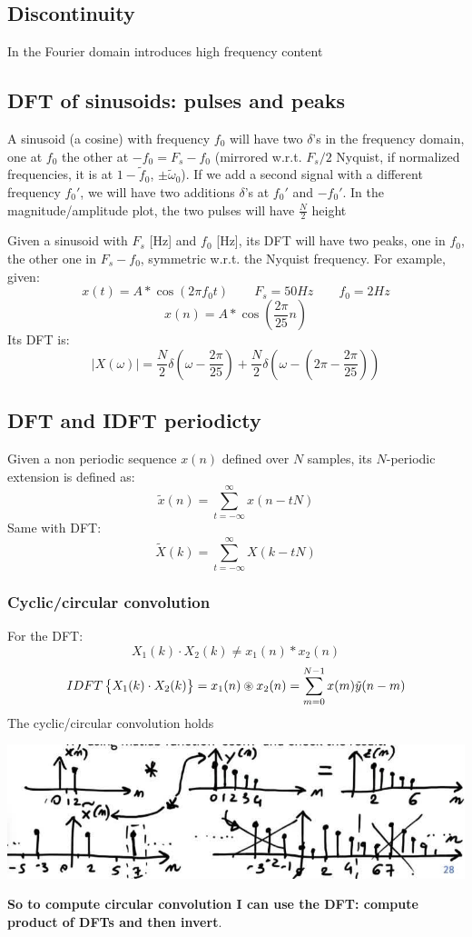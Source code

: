 \subsection{Discontinuity}
In the Fourier domain introduces high frequency content

\subsection{DFT of sinusoids: pulses and peaks}
A sinusoid (a cosine) with frequency $f_0$ will have two $\delta$'s in the frequency domain, one at $f_0$ the other at $-f_0=F_s-f_0$ (mirrored w.r.t. $F_s/2$ Nyquist, if normalized frequencies, it is at $1-\tilde{f}_0$, $\pm\tilde{\omega}_0$). If we add a second signal with a different frequency $f_0'$, we will have two additions $\delta$'s at $f_0'$ and $-f_0'$. In the magnitude/amplitude plot, the two pulses will have $\frac{N}{2}$ height

Given a sinusoid with $F_s$ [Hz] and $f_0$ [Hz], its DFT will have two peaks, one in $f_0$, the other one in $F_s-f_0$, symmetric w.r.t. the Nyquist frequency. For example, given:
$$
x(t) = A*\cos(2\pi f_0t)\qquad F_s = 50Hz\qquad f_0 = 2Hz
$$
$$
x(n) = A*\cos\left(\frac{2\pi}{25}n\right)
$$
Its DFT is:
$$
|X(\omega)|=\frac{N}{2}\delta\left(\omega-\frac{2\pi}{25}\right)+
\frac{N}{2}\delta\left(\omega-\left(2\pi-\frac{2\pi}{25}\right)\right)
$$

\subsection{DFT and IDFT periodicty}
Given a non periodic sequence $x(n)$ defined over $N$ samples, its $N$-periodic extension is defined as:
$$
\tilde{x}(n)=\sum_{t=-\infty}^\infty x(n-tN)
$$
Same with DFT:
$$
\tilde{X}(k)=\sum_{t=-\infty}^\infty X(k-tN)
$$

\subsubsection{Cyclic/circular convolution}
For the DFT:
$$
X_1(k)\cdot X_2(k) \neq x_1(n)* x_2(n)
$$
$$
IDFT\begin{Bmatrix} {X_1(k)\cdot X_2(k)} \end{Bmatrix}= x_1(n)\circledast x_2(n)=\sum_{m=0}^{N-1}x(m)\tilde{y}(n-m)
$$
The cyclic/circular convolution holds
\begin{center}
    \includegraphics[width=1\textwidth]{images/cyclic_conv.png}
\end{center}
\textbf{So to compute circular convolution I can use the DFT: compute product of DFTs and then invert}.

